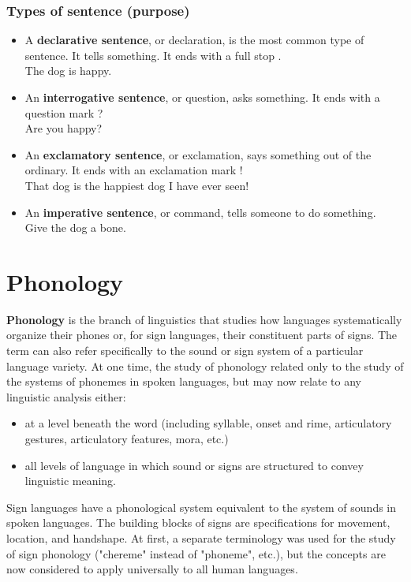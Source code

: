 \subsubsection{Types of sentence (purpose)}
\begin{itemize}
    \item A \textbf{declarative sentence}, or declaration, is the most common type of sentence. It tells something. It ends with a full stop . \\The dog is happy.
    \item An \textbf{interrogative sentence}, or question, asks something. It ends with a question mark ? \\Are you happy?
    \item An \textbf{exclamatory sentence}, or exclamation, says something out of the ordinary. It ends with an exclamation mark ! \\That dog is the happiest dog I have ever seen!
    \item An \textbf{imperative sentence}, or command, tells someone to do something. \\Give the dog a bone.
\end{itemize}

\section{Phonology \cite{wiki-phonology}}\label{Language: Phonology}
\textbf{Phonology} is the branch of linguistics that studies how languages systematically organize their phones or, for sign languages, their constituent parts of signs. The term can also refer specifically to the sound or sign system of a particular language variety. At one time, the study of phonology related only to the study of the systems of phonemes in spoken languages, but may now relate to any linguistic analysis either:

\begin{itemize}
    \item at a level beneath the word (including syllable, onset and rime, articulatory gestures, articulatory features, mora, etc.)
    \item all levels of language in which sound or signs are structured to convey linguistic meaning.
\end{itemize}

Sign languages have a phonological system equivalent to the system of sounds in spoken languages. The building blocks of signs are specifications for movement, location, and handshape. At first, a separate terminology was used for the study of sign phonology ("chereme" instead of "phoneme", etc.), but the concepts are now considered to apply universally to all human languages.


